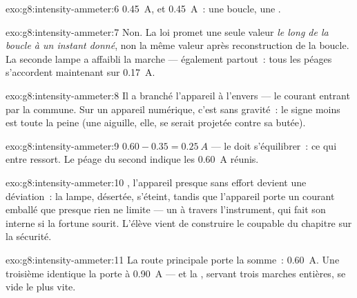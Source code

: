 \begin{solution}{exo:g8:intensity-ammeter:6}
\qty{0.45}{A}, et \qty{0.45}{A}~: une boucle, une .
\end{solution}

\begin{solution}{exo:g8:intensity-ammeter:7}
Non. La loi promet une seule valeur \emph{le long de la boucle à un
instant donné}, non la même valeur après reconstruction de la boucle.
La seconde lampe a affaibli la marche --- également partout~: tous
les péages s'accordent maintenant sur \qty{0.17}{A}.
\end{solution}

\begin{solution}{exo:g8:intensity-ammeter:8}
Il a branché l'appareil à l'envers --- le courant entrant par la
 commune. Sur un appareil numérique, c'est sans gravité~: le
signe moins est toute la peine (une aiguille, elle, se serait
projetée contre sa butée).
\end{solution}

\begin{solution}{exo:g8:intensity-ammeter:9}
$0.60 - 0.35 = \qty{0.25}{A}$ --- le  doit s'équilibrer~: ce qui
entre ressort. Le péage du second  indique les \qty{0.60}{A}
réunis.
\end{solution}

\begin{solution}{exo:g8:intensity-ammeter:10}
, l'appareil presque sans effort devient une
déviation~: la lampe, désertée, s'éteint, tandis que l'appareil porte
un courant emballé que presque rien ne limite --- un  à
travers l'instrument, qui fait  son  interne si la
fortune sourit. L'élève vient de construire le coupable du chapitre
sur la sécurité.
\end{solution}

\begin{solution}{exo:g8:intensity-ammeter:11}
La route principale porte la somme~: \qty{0.60}{A}. Une troisième
 identique la porte à \qty{0.90}{A} --- et la , servant
trois marches entières, se vide le plus vite.
\end{solution}

